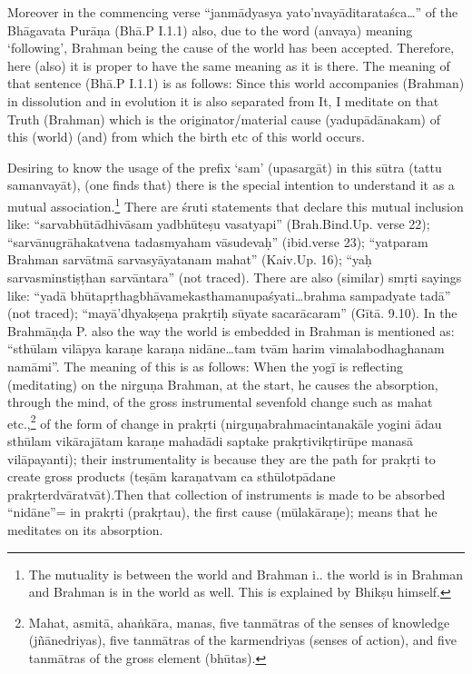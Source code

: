 Moreover in the commencing verse “janmādyasya yato’nvayāditarata\-śca…” of the Bhāgavata Purāṇa (Bhā.P I.1.1) also, due to the word (anvaya) meaning ‘following’, Brahman being the cause of the world has been accepted. Therefore, here (also) it is proper to have the same meaning as it is there. The meaning of that sentence (Bhā.P I.1.1) is as follows:  Since this world accompanies (Brahman) in dissolution and in evolution it is also separated from It, I meditate on that Truth (Brahman) which is the originator/material cause (yadupādānakam) of this (world) (and) from which the birth etc of this world occurs.   

Desiring to know the usage of the prefix ‘sam’ (upasargāt) in this sūtra  (tattu samanvayāt), (one finds that) there is the special intention to understand it as a mutual association.\footnote{The mutuality is between the world and Brahman i.. the world is in Brahman and Brahman is in the world as well. This is explained by Bhikṣu himself.} There are śruti statements that declare this mutual inclusion like: “sarvabhūtādhivāsam yad\break bhūteṣu vasatyapi” (Brah.Bind.Up. verse 22); “sarvānugrāhakatvena tadasmyaham vāsudevaḥ” (ibid.verse 23); “yatparam Brahman sarvā\-tmā sarvasyāyatanam mahat” (Kaiv.Up. 16); “yaḥ sarvasminstiṣṭhan sarvāntara” (not traced). There are also (similar) smṛti sayings like: “yadā bhūtapṛthagbhāvamekasthamanupaśyati…brahma sampadyate tadā” (not traced); “mayā’dhyakṣeṇa prakṛtiḥ sūyate sacarācaram” (Gītā. 9.10). In the Brahmāṇḍa P. also the way the world is embedded in Brahman is mentioned as: “sthūlam vilāpya karaṇe karaṇa nidāne…tam tvām harim vimalabodhaghanam namāmi”. The meaning of this is as follows: When the yogī is reflecting (meditating) on the nirguṇa Brahman, at the start, he causes the absorption, through the mind, of the gross instrumental sevenfold change such as mahat etc.,\footnote{Mahat, asmitā, ahaṅkāra, manas, five tanmātras of the senses of knowledge (jñānedriyas), five tanmātras of the karmendriyas (senses of action), and five tanmātras of the gross element (bhūtas).} of the form of change in prakṛti (nirguṇabrahmacintanakāle yogini ādau sthūlam vikārajātam karaṇe mahadādi  saptake prakṛtivikṛtirūpe manasā vilāpayanti); their instrumentality is because they are the path for prakṛti to create gross products (teṣām karaṇatvam ca sthūlotpādane prakṛterdvāratvāt).Then that collection of instruments is made to be absorbed “nidāne”= in prakṛti (prakṛtau), the first cause (mūlakāraṇe); means that he meditates on its absorption. 

